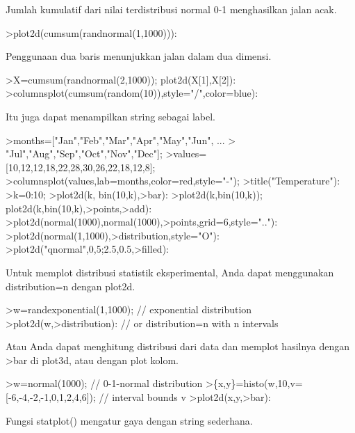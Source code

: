 \documentclass[a4paper,10pt]{article}
\begin{document}
\begin{eulernotebook}
\begin{eulercomment}
\begin{eulercomment}
\begin{eulercomment}
\begin{eulercomment}
\begin{eulercomment}
\begin{eulercomment}
\begin{eulercomment}
\begin{eulercomment}
\begin{eulercomment}
\begin{eulercomment}
\begin{eulercomment}
Jumlah kumulatif dari nilai terdistribusi normal 0-1 menghasilkan
jalan acak.
\end{eulercomment}
\begin{eulerprompt}
>plot2d(cumsum(randnormal(1,1000))):
\end{eulerprompt}
\begin{eulercomment}
Penggunaan dua baris menunjukkan jalan dalam dua dimensi.
\end{eulercomment}
\begin{eulerprompt}
>X=cumsum(randnormal(2,1000)); plot2d(X[1],X[2]):
>columnsplot(cumsum(random(10)),style="/",color=blue):
\end{eulerprompt}
\begin{eulercomment}
Itu juga dapat menampilkan string sebagai label.
\end{eulercomment}
\begin{eulerprompt}
>months=["Jan","Feb","Mar","Apr","May","Jun", ...
>  "Jul","Aug","Sep","Oct","Nov","Dec"];
>values=[10,12,12,18,22,28,30,26,22,18,12,8];
>columnsplot(values,lab=months,color=red,style="-");
>title("Temperature"):
>k=0:10;
>plot2d(k, bin(10,k),>bar):
>plot2d(k,bin(10,k)); plot2d(k,bin(10,k),>points,>add):
>plot2d(normal(1000),normal(1000),>points,grid=6,style=".."):
>plot2d(normal(1,1000),>distribution,style="O"):
>plot2d("qnormal",0,5;2.5,0.5,>filled):
\end{eulerprompt}
\begin{eulercomment}
Untuk memplot distribusi statistik eksperimental, Anda dapat
menggunakan distribution=n dengan plot2d.
\end{eulercomment}
\begin{eulerprompt}
>w=randexponential(1,1000); // exponential distribution
>plot2d(w,>distribution): // or distribution=n with n intervals
\end{eulerprompt}
\begin{eulercomment}
Atau Anda dapat menghitung distribusi dari data dan memplot hasilnya
dengan \textgreater{}bar di plot3d, atau dengan plot kolom.
\end{eulercomment}
\begin{eulerprompt}
>w=normal(1000); // 0-1-normal distribution
>\{x,y\}=histo(w,10,v=[-6,-4,-2,-1,0,1,2,4,6]); // interval bounds v
>plot2d(x,y,>bar):
\end{eulerprompt}
\begin{eulercomment}
Fungsi statplot() mengatur gaya dengan string sederhana.
\end{eulercomment}
\begin{eulerprompt}

\end{eulerprompt}
\end{eulercomment}
\end{eulercomment}
\end{eulercomment}
\end{eulercomment}
\end{eulercomment}
\end{eulercomment}
\end{eulercomment}
\end{eulercomment}
\end{eulercomment}
\end{eulercomment}
\end{eulernotebook}
\end{document}
